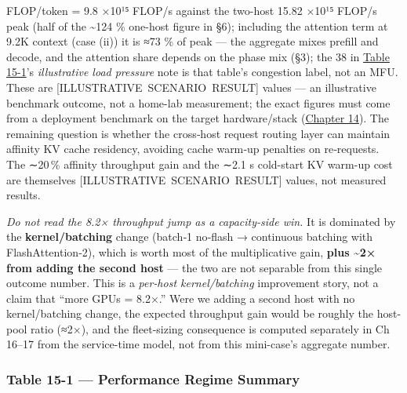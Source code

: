 FLOP/token = 9.8 ×10¹⁵ FLOP/s against the two-host 15.82 ×10¹⁵ FLOP/s
peak (half of the \textasciitilde124 \% one-host figure in §6);
including the attention term at 9.2K context (case (ii)) it is ≈73 \% of
peak --- the aggregate mixes prefill and decode, and the attention share
depends on the phase mix (§3); the 38 in \hyperref[tab:15.1]{Table 15-1}'s \emph{illustrative
load pressure} note is that table's congestion label, not an MFU. These
are \mbox{{[}ILLUSTRATIVE SCENARIO RESULT{]}} values --- an illustrative
benchmark outcome, not a home-lab measurement; the exact figures must
come from a deployment benchmark on the target hardware/stack (\hyperref[chap:14]{Chapter 14}). The remaining question is whether the cross‑host request routing
layer can maintain affinity KV cache residency, avoiding cache warm‑up
penalties on re‑requests. The ∼20\,\% affinity throughput gain and the
∼2.1 s cold-start KV warm-up cost are themselves \mbox{{[}ILLUSTRATIVE
SCENARIO RESULT{]}} values, not measured results.

\emph{Do not read the 8.2× throughput jump as a capacity-side win.} It
is dominated by the \textbf{kernel/batching} change (batch‑1 no‑flash →
continuous batching with FlashAttention‑2), which is worth most of the
multiplicative gain, \textbf{plus \textasciitilde2× from adding the
second host} --- the two are not separable from this single outcome
number. This is a \emph{per‑host kernel/batching} improvement story, not
a claim that ``more GPUs = 8.2×.'' Were we adding a second host with no
kernel/batching change, the expected throughput gain would be roughly
the host-pool ratio (≈2×), and the fleet-sizing consequence is computed
separately in Ch 16--17 from the service-time model, not from this
mini-case's aggregate number.


\subsubsection{Table 15-1 --- Performance Regime
Summary}\label{table-15-1-performance-regime-summary}

